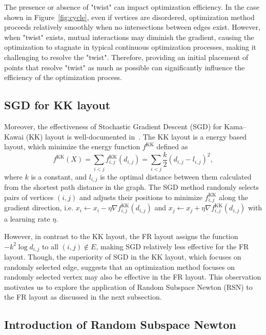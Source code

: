 \documentclass[dvipdfmx,lettersize,journal]{IEEEtran}
\begin{document}
The presence or absence of "twist" can impact optimization efficiency.
In the case shown in Figure~\ref{fig:cycle}, even if vertices are disordered, optimization method proceeds relatively smoothly when no intersections between edges exist.
However, when "twist" exists, mutual interactions may diminish the gradient, causing the optimization to stagnate in typical continuous optimization processes, making it challenging to resolve the "twist".
Therefore, providing an initial placement of points that resolve "twist" as much as possible can significantly influence the efficiency of the optimization process.

\subsection{SGD for KK layout}\label{ssec:sgd}

Moreover, the effectiveness of Stochastic Gradient Descent (SGD) for Kama--Kawai (KK) layout is well-documented in~\cite{8419285}.
The KK layout is a energy based layout, which minimize the energy function $f^{\mathrm{KK}}$ defined as
\begin{equation*}
  f^{\mathrm{KK}}(X) = \sum_{i<j} f^{\mathrm{KK}}_{i,j}(d_{i,j}) = \sum_{i<j} \frac{k}{2}(d_{i,j}-l_{i,j})^2,
\end{equation*}
where $k$ is a constant, and $l_{i,j}$ is the optimal distance between them calculated from the shortest path distance in the graph.
The SGD method randomly selects pairs of vertices $(i,j)$ and adjusts their positions to minimize $f^{\mathrm{KK}}_{i,j}$ along the gradient direction, i.e. $x_i \gets x_i - \eta \nabla f^{\mathrm{KK}}_{i,j}(d_{i,j})$ and $x_j \gets x_j + \eta \nabla f^{\mathrm{KK}}_{i,j}(d_{i,j})$ with a learning rate $\eta$.

However, in contrast to the KK layout, the FR layout assigns the function $-k^2\log{d_{i,j}}$ to all $(i,j) \notin E$, making SGD relatively less effective for the FR layout.
Though, the superiority of SGD in the KK layout, which focuses on randomly selected edge, suggests that an optimization method focuses on randomly selected vertex may also be effective in the FR layout.
This observation motivates us to explore the application of Random Subspace Newton (RSN) to the FR layout as discussed in the next subsection.

\subsection{Introduction of Random Subspace Newton}\label{ssec:introRSN}
\end{document}
